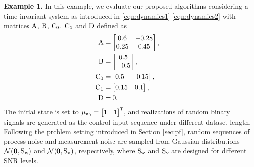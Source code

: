 \textbf{Example 1.} 
In this example, we evaluate our proposed algorithms considering a time-invariant system as introduced in \eqref{eqn:dynamics1}-\eqref{eqn:dynamics2} with matrices ${ \mathrm{A} }$, ${ \mathrm{B} }$, ${ \mathrm{C} }_0$, ${ \mathrm{C} }_1$ and ${ \mathrm{D} }$ defined as 
\begin{subequations}\label{eq:system example1_1}
\begin{align}
        { \mathrm{A} } &= \begin{bmatrix}
            0.6 & -0.28 \\ 0.25 & 0.45
        \end{bmatrix},\\
        { \mathrm{B} } &= \begin{bmatrix}
            0.5 \\ -0.5
        \end{bmatrix},\\
        { \mathrm{C} }_0 &= \begin{bmatrix}
            0.5 & -0.15
        \end{bmatrix},\\
        { \mathrm{C} }_1 &= \begin{bmatrix}
            0.15 & 0.1
        \end{bmatrix},\\
        { \mathrm{D} } &= 0.
\end{align}
\end{subequations}
The initial state is set to $\mu_{\mathbf{x}_0} = \begin{bmatrix}
    1 & 1 
\end{bmatrix}^\tr$, and realizations of random binary signals are generated as the control input sequence under different dataset length. 
Following the problem setting introduced in Section \ref{sec:pf}, random sequences of process noise and measurement noise are sampled from Gaussian distributions ${\mathcal{N}}(\mathbf{0}, { \mathrm{S} }_{ \mathrm{w} })$ and ${\mathcal{N}}(\mathbf{0}, { \mathrm{S} }_{ \mathrm{v} })$, respectively, where ${ \mathrm{S} }_{ \mathrm{w} }$ and ${ \mathrm{S} }_{ \mathrm{v} }$ are designed for different SNR levels. 

